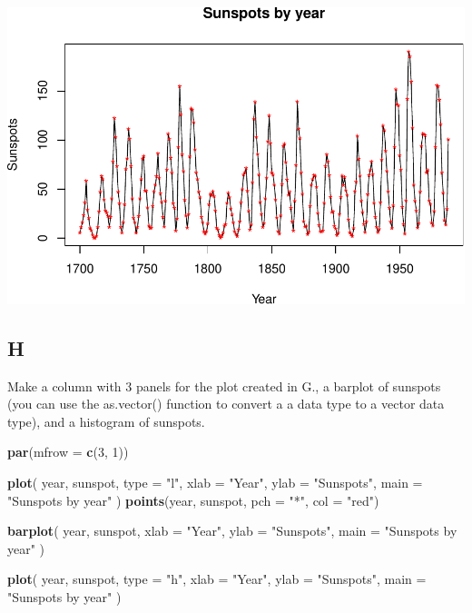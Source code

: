 \documentclass[
]{article}
\newenvironment{Shaded}{\begin{snugshade}}{\end{snugshade}}
\newcommand{\AttributeTok}[1]{\textcolor[rgb]{0.13,0.29,0.53}{#1}}
\newcommand{\DecValTok}[1]{\textcolor[rgb]{0.00,0.00,0.81}{#1}}
\newcommand{\FunctionTok}[1]{\textcolor[rgb]{0.13,0.29,0.53}{\textbf{#1}}}
\newcommand{\NormalTok}[1]{#1}
\newcommand{\StringTok}[1]{\textcolor[rgb]{0.31,0.60,0.02}{#1}}
\begin{document}
\includegraphics{es3_files/figure-latex/unnamed-chunk-7-1.pdf}

\hypertarget{h}{%
\subsection{H}\label{h}}

Make a column with 3 panels for the plot created in G., a barplot of
sunspots (you can use the as.vector() function to convert a a data type
to a vector data type), and a histogram of sunspots.

\begin{Shaded}
\begin{Highlighting}[]
\FunctionTok{par}\NormalTok{(}\AttributeTok{mfrow =} \FunctionTok{c}\NormalTok{(}\DecValTok{3}\NormalTok{, }\DecValTok{1}\NormalTok{))}

\FunctionTok{plot}\NormalTok{(}
\NormalTok{  year,}
\NormalTok{  sunspot,}
  \AttributeTok{type =} \StringTok{"l"}\NormalTok{,}
  \AttributeTok{xlab =} \StringTok{"Year"}\NormalTok{,}
  \AttributeTok{ylab =} \StringTok{"Sunspots"}\NormalTok{,}
  \AttributeTok{main =} \StringTok{"Sunspots by year"}
\NormalTok{)}
\FunctionTok{points}\NormalTok{(year, sunspot, }\AttributeTok{pch =} \StringTok{"*"}\NormalTok{, }\AttributeTok{col =} \StringTok{"red"}\NormalTok{)}

\FunctionTok{barplot}\NormalTok{(}
\NormalTok{  year,}
\NormalTok{  sunspot,}
  \AttributeTok{xlab =} \StringTok{"Year"}\NormalTok{,}
  \AttributeTok{ylab =} \StringTok{"Sunspots"}\NormalTok{,}
  \AttributeTok{main =} \StringTok{"Sunspots by year"}
\NormalTok{)}

\FunctionTok{plot}\NormalTok{(}
\NormalTok{  year,}
\NormalTok{  sunspot,}
  \AttributeTok{type =} \StringTok{"h"}\NormalTok{,}
  \AttributeTok{xlab =} \StringTok{"Year"}\NormalTok{,}
  \AttributeTok{ylab =} \StringTok{"Sunspots"}\NormalTok{,}
  \AttributeTok{main =} \StringTok{"Sunspots by year"}
\NormalTok{)}
\end{Highlighting}
\end{Shaded}
\end{document}
